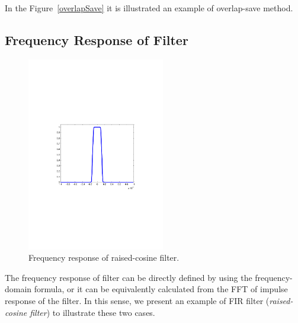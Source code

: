 In the Figure~\ref{overlapSave} it is illustrated an example of overlap-save method.

\subsection{Frequency Response of Filter}
\begin{figure}[t!]
    \centering
    \includegraphics[width=6cm]{./algorithms/overlap_save/figures/rc-fd-filter-SpS8.pdf}
    \caption{Frequency response of raised-cosine filter.}
    \label{freq_rc}
\end{figure}

The frequency response of filter can be directly defined by using the frequency-domain formula, or it can be equivalently calculated from the FFT of impulse response of the filter. In this sense, we present an example of FIR filter (\textit{raised-cosine filter}) to illustrate these two cases.

